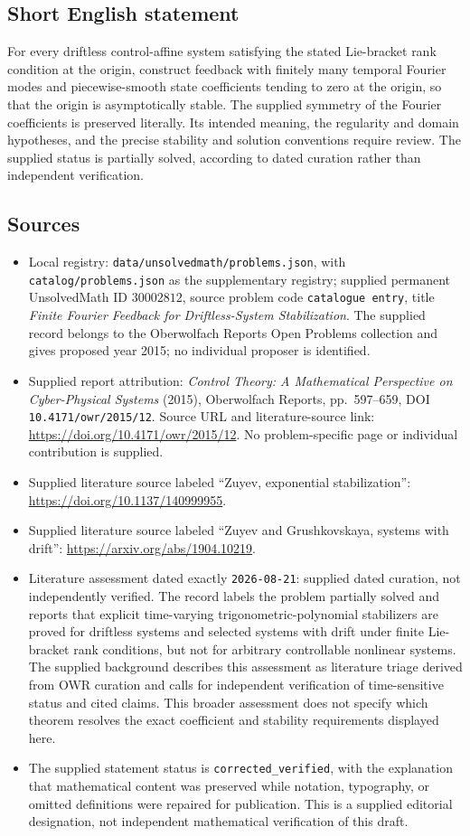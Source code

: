 \documentclass[11pt]{article}
\begin{document}
\subsection{Short English statement}
For every driftless control-affine system satisfying the stated Lie-bracket rank condition at the origin, construct feedback with finitely many temporal Fourier modes and piecewise-smooth state coefficients tending to zero at the origin, so that the origin is asymptotically stable. The supplied symmetry of the Fourier coefficients is preserved literally. Its intended meaning, the regularity and domain hypotheses, and the precise stability and solution conventions require review. The supplied status is partially solved, according to dated curation rather than independent verification.
\subsection{Sources}
\begin{itemize}
\item Local registry: \texttt{data/unsolvedmath/problems.json}, with \texttt{catalog/problems.json} as the supplementary registry; supplied permanent UnsolvedMath ID \(30002812\), source problem code \texttt{catalogue entry}, title \emph{Finite Fourier Feedback for Driftless-System Stabilization}. The supplied record belongs to the Oberwolfach Reports Open Problems collection and gives proposed year 2015; no individual proposer is identified.
\item Supplied report attribution: \emph{Control Theory: A Mathematical Perspective on Cyber-Physical Systems} (2015), Oberwolfach Reports, pp.\ 597--659, DOI \texttt{10.4171/owr/2015/12}. Source URL and literature-source link: \url{https://doi.org/10.4171/owr/2015/12}. No problem-specific page or individual contribution is supplied.
\item Supplied literature source labeled ``Zuyev, exponential stabilization'': \url{https://doi.org/10.1137/140999955}.
\item Supplied literature source labeled ``Zuyev and Grushkovskaya, systems with drift'': \url{https://arxiv.org/abs/1904.10219}.
\item Literature assessment dated exactly \texttt{2026-08-21}: supplied dated curation, not independently verified. The record labels the problem partially solved and reports that explicit time-varying trigonometric-polynomial stabilizers are proved for driftless systems and selected systems with drift under finite Lie-bracket rank conditions, but not for arbitrary controllable nonlinear systems. The supplied background describes this assessment as literature triage derived from OWR curation and calls for independent verification of time-sensitive status and cited claims. This broader assessment does not specify which theorem resolves the exact coefficient and stability requirements displayed here.
\item The supplied statement status is \texttt{corrected\_verified}, with the explanation that mathematical content was preserved while notation, typography, or omitted definitions were repaired for publication. This is a supplied editorial designation, not independent mathematical verification of this draft.
\end{itemize}
\end{document}

